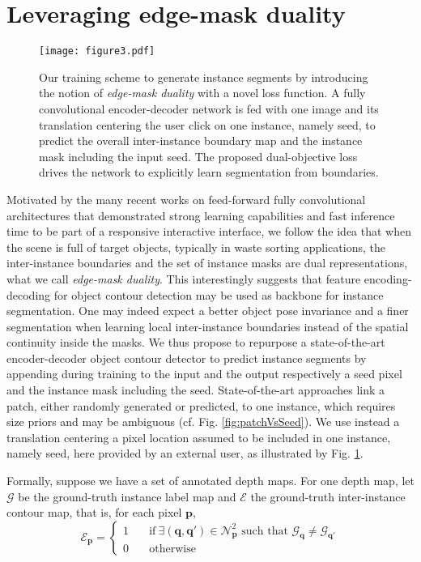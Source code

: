 \documentclass[runningheads,a4paper]{llncs}
\begin{document}
\section{Leveraging edge-mask duality}
\label{sec:duality}

\begin{figure}[b!]
\centering
\texttt{[image: figure3.pdf]}
\caption{Our training scheme to generate instance segments by introducing the notion of \emph{edge-mask duality} with a novel loss function. A fully convolutional encoder-decoder network is fed with one image and its translation centering the user click on one instance, namely seed, to predict the overall inter-instance boundary map and the instance mask including the input seed. The proposed dual-objective loss drives the network to explicitly learn segmentation from boundaries.}
\label{fig:trainingscheme}
\end{figure}

Motivated by the many recent works on feed-forward fully convolutional architectures that demonstrated strong learning capabilities and fast inference time to be part of a responsive interactive interface, we follow the idea that when the scene is full of target objects, typically in waste sorting applications, the inter-instance boundaries and the set of instance masks are dual representations, what we call \emph{edge-mask duality}. This interestingly suggests that feature encoding-decoding for object contour detection may be used as backbone for instance segmentation. One may indeed expect a better object pose invariance and a finer segmentation when learning local inter-instance boundaries instead of the spatial continuity inside the masks. We thus propose to repurpose a state-of-the-art encoder-decoder object contour detector to predict instance segments by appending during training to the input and the output respectively a seed pixel and the instance mask including the seed. State-of-the-art approaches \cite{MaskRCNN, SharpMask} link a patch, either randomly generated or predicted, to one instance, which requires size priors and may be ambiguous (cf. Fig. \ref{fig:patchVsSeed}). We use instead a translation centering a pixel location assumed to be included in one instance, namely seed, here provided by an external user, as illustrated by Fig. \ref{fig:trainingscheme}.

Formally, suppose we have a set of annotated depth maps. For one depth map, let $\mathcal{G}$ be the ground-truth instance label map and $\mathcal{E}$ the ground-truth inter-instance contour map, that is, for each pixel $\mathbf{p}$,
\begin{equation}
\mathcal{E}_\mathbf{p} = \left\{ 
\begin{aligned}
1&\quad  \text{if}\ \exists (\mathbf{q}, \mathbf{q'}) \in \mathcal{N}_\mathbf{p}^2 \text{ such that } \mathcal{G}_\mathbf{q}\neq \mathcal{G}_\mathbf{q'}\\
0 & \quad \text{otherwise}
\end{aligned} \right .
\end{equation}
\end{document}
